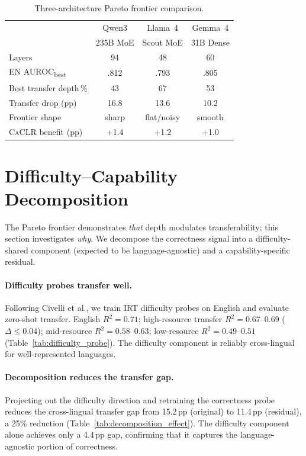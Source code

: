 \documentclass[11pt,a4paper]{article}
\newcommand{\caclr}{\textsc{CaCLR}}
\begin{document}
\begin{table}[t]
\centering
\small
\caption{Three-architecture Pareto frontier comparison.}
\label{tab:pareto_comparison}
\begin{tabular}{lccc}
\toprule
& Qwen3 & Llama~4 & Gemma~4 \\
& 235B MoE & Scout MoE & 31B Dense \\
\midrule
Layers & 94 & 48 & 60 \\
EN AUROC\textsubscript{best} & .812 & .793 & .805 \\
Best transfer depth\,\% & 43 & 67 & 53 \\
Transfer drop (pp) & 16.8 & 13.6 & 10.2 \\
Frontier shape & sharp & flat/noisy & smooth \\
\caclr{} benefit (pp) & +1.4 & +1.2 & +1.0 \\
\bottomrule
\end{tabular}
\end{table}

\section{Difficulty--Capability Decomposition}
\label{sec:decomposition}

The Pareto frontier demonstrates \emph{that} depth modulates transferability; this section investigates \emph{why}.
We decompose the correctness signal into a difficulty-shared component (expected to be language-agnostic) and a capability-specific residual.

\paragraph{Difficulty probes transfer well.}
Following Civelli et al., we train IRT difficulty probes on English and evaluate zero-shot transfer.
English $R^2 = 0.71$; high-resource transfer $R^2 = 0.67$--$0.69$ ($\Delta \leq 0.04$); mid-resource $R^2 = 0.58$--$0.63$; low-resource $R^2 = 0.49$--$0.51$ (Table~\ref{tab:difficulty_probe}).
The difficulty component is reliably cross-lingual for well-represented languages.

\paragraph{Decomposition reduces the transfer gap.}
Projecting out the difficulty direction and retraining the correctness probe reduces the cross-lingual transfer gap from 15.2\,pp (original) to 11.4\,pp (residual), a 25\% reduction (Table~\ref{tab:decomposition_effect}).
The difficulty component alone achieves only a 4.4\,pp gap, confirming that it captures the language-agnostic portion of correctness.
\end{document}
